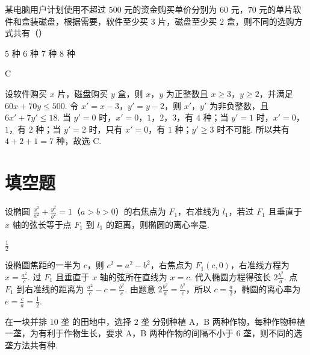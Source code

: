 \begin{problem}
某电脑用户计划使用不超过 \(500\) 元的资金购买单价分别为 \(60\) 元，\(70\) 元的单片软件和盒装磁盘，根据需要，软件至少买 \(3\) 片，磁盘至少买 \(2\) 盒，则不同的选购方式共有（\quad）

\choices
    {\(5\text{ 种}\)}
    {\(6\text{ 种}\)}
    {\(7\text{ 种}\)}
    {\(8\text{ 种}\)}
\end{problem}

\begin{answer}
C
\end{answer}

\begin{solution}
设软件购买 \(x\) 片，磁盘购买 \(y\) 盒，则 \(x\)，\(y\) 为正整数且 \(x\geqslant3\)，\(y\geqslant2\)，并满足
\(60x+70y\leqslant500\).
令 \(x'=x-3\)，\(y'=y-2\)，则 \(x'\)，\(y'\) 为非负整数，且
\(6x'+7y'\leqslant18\).
当 \(y'=0\) 时，\(x'=0\)，\(1\)，\(2\)，\(3\)，有 \(4\) 种；当 \(y'=1\) 时，\(x'=0\)，\(1\)，有 \(2\) 种；当 \(y'=2\) 时，只有 \(x'=0\)，有 \(1\) 种；\(y'\geqslant3\) 时不可能. 所以共有 \(4+2+1=7\) 种，故选 C.
\end{solution}

\section{填空题}

\begin{problem}
设椭圆 \(\frac{x^2}{a^2}+\frac{y^2}{b^2}=1\)（\(a>b>0\)）的右焦点为 \(F_1\)，右准线为 \(l_1\)，若过 \(F_1\) 且垂直于 \(x\) 轴的弦长等于点 \(F_1\) 到 \(l_1\) 的距离，则椭圆的离心率是\fillinblank{}.
\end{problem}

\begin{answer}
\(\frac{1}{2}\)
\end{answer}

\begin{solution}
设椭圆焦距的一半为 \(c\)，则 \(c^2=a^2-b^2\)，右焦点为 \(F_1(c,0)\)，右准线方程为 \(x=\frac{a^2}{c}\).
过 \(F_1\) 且垂直于 \(x\) 轴的弦所在直线为 \(x=c\). 代入椭圆方程得弦长
\(2\frac{b^2}{a}\). 点 \(F_1\) 到右准线的距离为
\(\frac{a^2}{c}-c=\frac{b^2}{c}\).
由题意 \(2\frac{b^2}{a}=\frac{b^2}{c}\)，所以 \(c=\frac{a}{2}\)，椭圆的离心率为 \(e=\frac{c}{a}=\frac{1}{2}\).
\end{solution}

\begin{problem}
在一块并排 \(10\text{ 垄}\) 的田地中，选择 \(2\text{ 垄}\) 分别种植 A，B 两种作物，每种作物种植一垄，为有利于作物生长，要求 A，B 两种作物的间隔不小于 \(6\text{ 垄}\)，则不同的选垄方法共有\fillinblank{}\(\text{种}\).
\end{problem}


